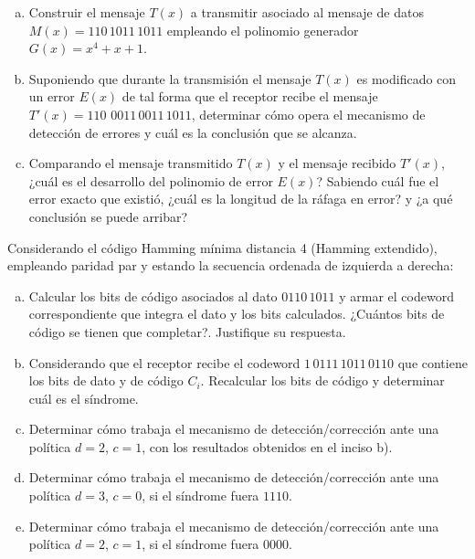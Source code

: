 \documentclass[12pt,a4paper]{article}
\begin{document}
\begin{enumerate}[a)]
	\item Construir el mensaje $T(x)$ a transmitir asociado al mensaje de datos
	$M(x) = 110\,1011\,1011$ empleando el polinomio generador $G(x) = x^4 + x + 1$.

	\item Suponiendo que durante la transmisión el mensaje $T(x)$ es modificado con un error $E(x)$ de tal forma que el receptor recibe el mensaje $T'(x) = 110\,\, 0011\,0011\,1011$, determinar cómo opera el mecanismo de detección de errores y cuál es la conclusión que se alcanza.

	\item Comparando el mensaje transmitido $T(x)$ y el mensaje recibido $T'(x)$, ¿cuál es el desarrollo del polinomio de error $E(x)$? Sabiendo cuál fue el error exacto que existió, ¿cuál es la longitud de la ráfaga en error? y ¿a qué conclusión se puede arribar?
\end{enumerate}


 Considerando el código Hamming mínima distancia 4 (Hamming extendido), empleando paridad par y estando la secuencia ordenada de izquierda a derecha:

\begin{enumerate}[a)]

	\item Calcular los bits de código asociados al dato $0110\,1011$ y armar el codeword correspondiente que integra el dato y los bits calculados. ¿Cuántos bits de código se tienen que completar?. Justifique su respuesta. 

	\item Considerando que el receptor recibe el codeword $1\,0111\,1011\,0110$ que contiene los bits de dato y de código $C_i$. Recalcular los bits de código y determinar cuál es el síndrome.

	\item Determinar cómo trabaja el mecanismo de detección/corrección ante una política $d=2$, $c=1$, con los resultados obtenidos en el inciso b).

	\item Determinar cómo trabaja el mecanismo de detección/corrección ante una política $d=3$, $c=0$, si el síndrome fuera $1110$.

	\item Determinar cómo trabaja el mecanismo de detección/corrección ante una política $d=2$, $c=1$, si el síndrome fuera $0000$.


\end{enumerate}
\end{document}
